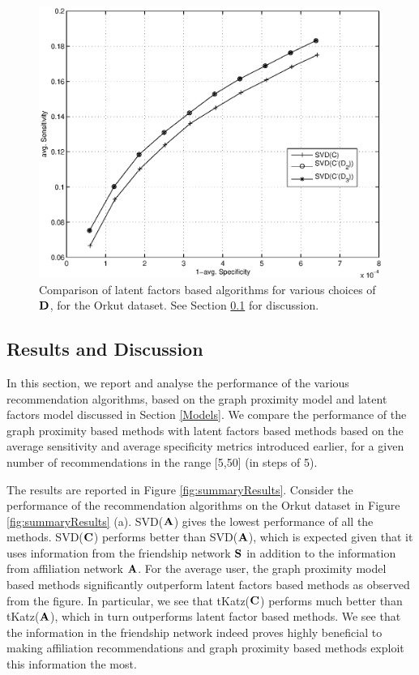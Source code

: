 \begin{figure}[h]
  \begin{center}
    \includegraphics[scale=0.4]{summarySVDOrkut.eps}
  \end{center}
  \caption{Comparison of latent factors based algorithms for various choices of $\mathbf{D}$, for the Orkut dataset. See Section \ref{Results and Discussion} for discussion.}
  \label{fig:summarySVD}
\end{figure}

\subsection{Results and Discussion}
\label{Results and Discussion}
In this section, we report and analyse the performance of the various recommendation algorithms, based on the graph proximity model and latent factors model discussed in Section \ref{Models}. We compare the performance of the graph proximity based methods with latent factors based methods based on the average sensitivity and average specificity metrics introduced earlier, for a given number of recommendations in the range [5,50] (in steps of 5).

The results are reported in Figure \ref{fig:summaryResults}.
Consider the performance of the recommendation algorithms on the Orkut dataset in Figure \ref{fig:summaryResults} (a). SVD($\mathbf{A}$) gives the lowest performance of all the methods. SVD($\mathbf{C}$) performs better than SVD($\mathbf{A}$), which is expected given that it uses information from the friendship network $\mathbf{S}$ in addition to the information from affiliation network $\mathbf{A}$. For the average user, the graph proximity model based methods significantly outperform latent factors based methods as observed from the figure. In particular, we see that tKatz($\mathbf{C}$) performs much better than tKatz($\mathbf{A}$), which in turn outperforms latent factor based methods. We see that the information in the friendship network indeed proves highly beneficial to making affiliation recommendations and graph proximity based methods exploit this information the most.

